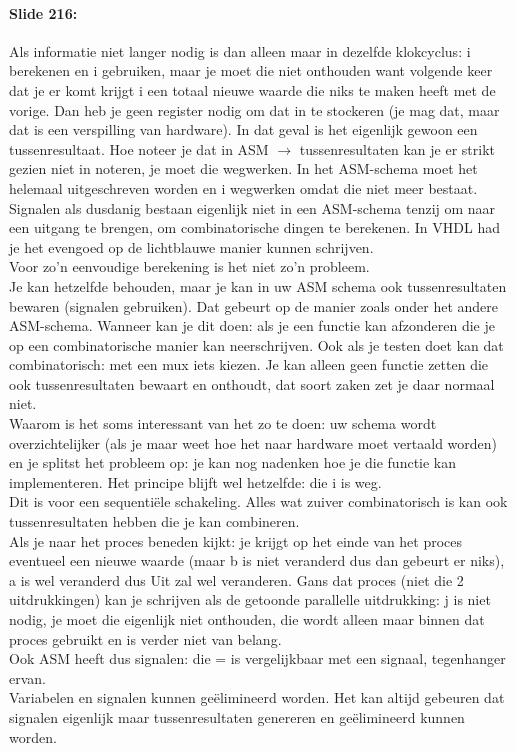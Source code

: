 \documentclass[10pt,a4paper]{book}
\begin{document}
\paragraph{Slide 216:} Als informatie niet langer nodig is dan alleen maar in dezelfde klokcyclus: i berekenen en i gebruiken, maar je moet die niet onthouden want volgende keer dat je er komt krijgt i een totaal nieuwe waarde die niks te maken heeft met de vorige. Dan heb je geen register nodig om dat in te stockeren (je mag dat, maar dat is een verspilling van hardware). In dat geval is het eigenlijk gewoon een tussenresultaat. Hoe noteer je dat in ASM $\rightarrow$ tussenresultaten kan je er strikt gezien niet in noteren, je moet die wegwerken. In het ASM-schema moet het helemaal uitgeschreven worden en i wegwerken omdat die niet meer bestaat. Signalen als dusdanig bestaan eigenlijk niet in een ASM-schema tenzij om naar een uitgang te brengen, om combinatorische dingen te berekenen. In VHDL had je het evengoed op de lichtblauwe manier kunnen schrijven.\\
Voor zo'n eenvoudige berekening is het niet zo'n probleem.\\
Je kan hetzelfde behouden, maar je kan in uw ASM schema ook tussenresultaten bewaren (signalen gebruiken). Dat gebeurt op de manier zoals onder het andere ASM-schema. Wanneer kan je dit doen: als je een functie kan afzonderen die je op een combinatorische manier kan neerschrijven. Ook als je testen doet kan dat combinatorisch: met een mux iets kiezen. Je kan alleen geen functie zetten die ook tussenresultaten bewaart en onthoudt, dat soort zaken zet je daar normaal niet.\\
Waarom is het soms interessant van het zo te doen: uw schema wordt overzichtelijker (als je maar weet hoe het naar hardware moet vertaald worden) en je splitst het probleem op: je kan nog nadenken hoe je die functie kan implementeren. Het principe blijft wel hetzelfde: die i is weg.\\
Dit is voor een sequenti\"ele schakeling. Alles wat zuiver combinatorisch is kan ook tussenresultaten hebben die je kan combineren.\\
Als je naar het proces beneden kijkt: je krijgt op het einde van het proces eventueel een nieuwe waarde (maar b is niet veranderd dus dan gebeurt er niks), a is wel veranderd dus Uit zal wel veranderen. Gans dat proces (niet die 2 uitdrukkingen) kan je schrijven als de getoonde parallelle uitdrukking: j is niet nodig, je moet die eigenlijk niet onthouden, die wordt alleen maar binnen dat proces gebruikt en is verder niet van belang.\\
Ook ASM heeft dus signalen: die = is vergelijkbaar met een signaal, tegenhanger ervan.\\
Variabelen en signalen kunnen ge\"elimineerd worden. Het kan altijd gebeuren dat signalen eigenlijk maar tussenresultaten genereren en ge\"elimineerd kunnen worden.
\end{document}

